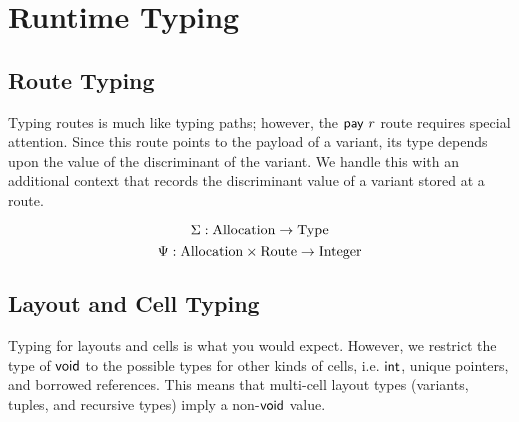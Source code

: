 \section*{Runtime Typing}
\subsection*{Route Typing}
Typing routes is much like typing paths; however, the $\mathsf{pay}~{r}$ route requires
special attention. Since this route points to the payload of a variant,
its type depends upon the value of the discriminant of the variant.
We handle this with an additional context that records the discriminant value
of a variant stored at a route.

$$ \Sigma : \mathrm{Allocation} \to \mathrm{Type}$$
$$ \Psi : \mathrm{Allocation} \times \mathrm{Route} \to \mathrm{Integer} $$



\subsection*{Layout and Cell Typing}
Typing for layouts and cells is what you would expect.
However, we restrict the type of $\mathsf{void}$ to the possible types for other
kinds of cells, i.e. $\mathsf{int}$, unique pointers, and borrowed references.
This means that multi-cell layout types (variants, tuples, and recursive types) imply
a non-$\mathsf{void}$ value.
\newline



